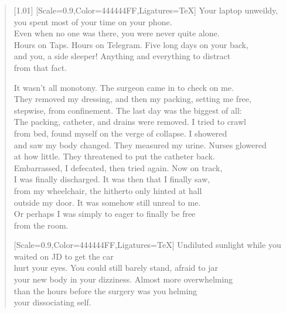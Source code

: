 \begin{verse}[1.01\textwidth]
  {[Scale=0.9,Color=444444FF,Ligatures=TeX]
  \vin Your laptop unweildy, you spent most of your time on your phone.\\
  \vin Even when no one was there, you were never quite alone.\\
  \vin Hours on Taps. Hours on Telegram. Five long days on your back,\\
  \vin and you, a side sleeper! Anything and everything to distract\\
  \vin from that fact.}

  It wasn't all monotony. The surgeon came in to check on me.\\
  They removed my dressing, and then my packing, setting me free,\\
  stepwise, from confinement. The last day was the biggest of all:\\
  The packing, catheter, and drains were removed. I tried to crawl\\
  from bed, found myself on the verge of collapse. I showered\\
  and saw my body changed. They measured my urine. Nurses glowered\\
  at how little. They threatened to put the catheter back.\\
  Embarrassed, I defecated, then tried again. Now on track,\\
  I was finally discharged. It was then that I finally saw,\\
  from my wheelchair, the hitherto only hinted at hall\\
  outside my door. It was somehow still unreal to me.\\
  Or perhaps I was simply to eager to finally be free\\
  from the room.
  \newpage

  {[Scale=0.9,Color=444444FF,Ligatures=TeX]
  \vin Undiluted sunlight while you waited on JD to get the car\\
  \vin hurt your eyes. You could still barely stand, afraid to jar\\
  \vin your new body in your dizziness. Almost more overwhelming\\
  \vin than the hours before the surgery was you helming\\
  \vin your dissociating self.}


\end{verse}
